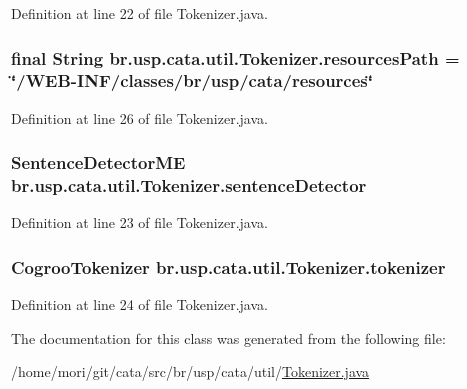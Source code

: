 Definition at line 22 of file Tokenizer.\+java.

\hypertarget{classbr_1_1usp_1_1cata_1_1util_1_1_tokenizer_a40d159a6de7af82f2b2dba36717ee3fe}{
\subsubsection[{resources\+Path}]{\setlength{\rightskip}{0pt plus 5cm}final String br.\+usp.\+cata.\+util.\+Tokenizer.\+resources\+Path = \char`\"{}/W\+E\+B-\/I\+N\+F/classes/br/usp/cata/resources\char`\"{}\hspace{0.3cm}{\ttfamily [private]}}}\label{classbr_1_1usp_1_1cata_1_1util_1_1_tokenizer_a40d159a6de7af82f2b2dba36717ee3fe}


Definition at line 26 of file Tokenizer.\+java.

\hypertarget{classbr_1_1usp_1_1cata_1_1util_1_1_tokenizer_a5b5c86bc5085e8e746529dc7b8e6bf86}{
\subsubsection[{sentence\+Detector}]{\setlength{\rightskip}{0pt plus 5cm}Sentence\+Detector\+M\+E br.\+usp.\+cata.\+util.\+Tokenizer.\+sentence\+Detector\hspace{0.3cm}{\ttfamily [private]}}}\label{classbr_1_1usp_1_1cata_1_1util_1_1_tokenizer_a5b5c86bc5085e8e746529dc7b8e6bf86}


Definition at line 23 of file Tokenizer.\+java.

\hypertarget{classbr_1_1usp_1_1cata_1_1util_1_1_tokenizer_ab749863082a50c302e5f1c86640cc8a3}{
\subsubsection[{tokenizer}]{\setlength{\rightskip}{0pt plus 5cm}Cogroo\+Tokenizer br.\+usp.\+cata.\+util.\+Tokenizer.\+tokenizer\hspace{0.3cm}{\ttfamily [private]}}}\label{classbr_1_1usp_1_1cata_1_1util_1_1_tokenizer_ab749863082a50c302e5f1c86640cc8a3}


Definition at line 24 of file Tokenizer.\+java.



The documentation for this class was generated from the following file\+:\begin{DoxyCompactItemize}
\item 
/home/mori/git/cata/src/br/usp/cata/util/\hyperlink{_tokenizer_8java}{Tokenizer.\+java}\end{DoxyCompactItemize}
